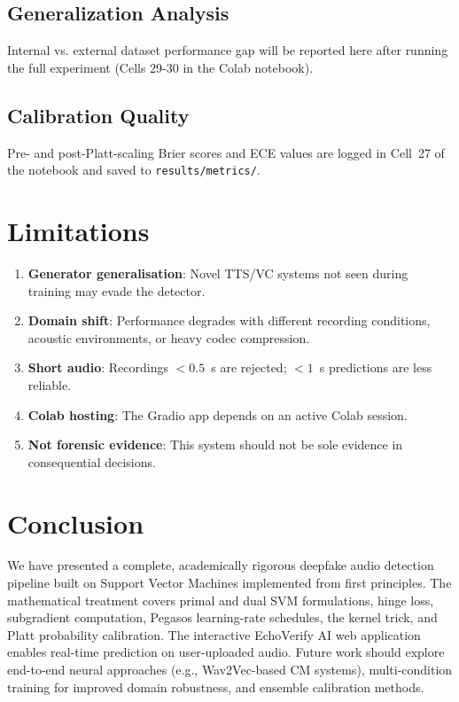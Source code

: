 \documentclass[conference]{IEEEtran}
\begin{document}
\subsection{Generalization Analysis}

Internal vs. external dataset performance gap will be reported here after
running the full experiment (Cells 29-30 in the Colab notebook).

\subsection{Calibration Quality}

Pre- and post-Platt-scaling Brier scores and ECE values are logged in
Cell~27 of the notebook and saved to \texttt{results/metrics/}.

\section{Limitations}
\label{sec:limitations}

\begin{enumerate}
  \item \textbf{Generator generalisation}: Novel TTS/VC systems not seen during
    training may evade the detector.
  \item \textbf{Domain shift}: Performance degrades with different recording
    conditions, acoustic environments, or heavy codec compression.
  \item \textbf{Short audio}: Recordings $<0.5$~s are rejected; $<1$~s predictions
    are less reliable.
  \item \textbf{Colab hosting}: The Gradio app depends on an active Colab session.
  \item \textbf{Not forensic evidence}: This system should not be sole evidence
    in consequential decisions.
\end{enumerate}

\section{Conclusion}
\label{sec:conclusion}

We have presented a complete, academically rigorous deepfake audio detection
pipeline built on Support Vector Machines implemented from first principles.
The mathematical treatment covers primal and dual SVM formulations, hinge loss,
subgradient computation, Pegasos learning-rate schedules, the kernel trick, and
Platt probability calibration. The interactive EchoVerify AI web application
enables real-time prediction on user-uploaded audio. Future work should explore
end-to-end neural approaches (e.g., Wav2Vec-based CM systems), multi-condition
training for improved domain robustness, and ensemble calibration methods.
\end{document}
